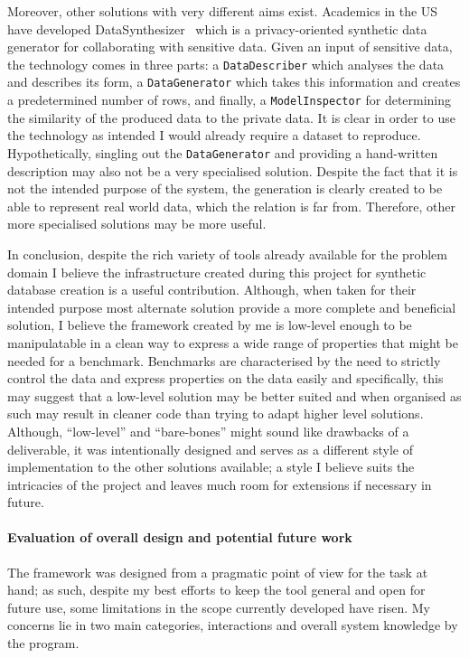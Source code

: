 Moreover, other solutions with very different aims exist. Academics in the US
have developed DataSynthesizer~\cite{DataSynthesizer} which is a privacy-oriented
synthetic data generator for collaborating with sensitive data. Given
an input of sensitive data, the technology comes in three parts: a
\lstinline{DataDescriber} which analyses the data and describes its form, a
\lstinline{DataGenerator} which takes this information and creates a
predetermined number of rows, and finally, a \lstinline{ModelInspector} for
determining the similarity of the produced data to the private data. It is clear
in order to use the technology as intended I would already require a dataset to
reproduce. Hypothetically, singling out the \lstinline{DataGenerator} and
providing a hand-written description may also not be a very specialised
solution. Despite the fact that it is not the intended purpose of the system,
the generation is clearly created to be able to represent real world data, which
the  relation is far from. Therefore, other more specialised
solutions may be more useful.

In conclusion, despite the rich variety of tools already available for the
problem domain I believe the infrastructure created during this project for
synthetic database creation is a useful contribution. Although, when taken for
their intended purpose most alternate solution provide a more complete and
beneficial solution, I believe the framework created by me is low-level enough
to be manipulatable in a clean way to express a wide range of properties that
might be needed for a benchmark. Benchmarks are characterised by the need to
strictly control the data and express properties on the data easily and
specifically, this may suggest that a low-level solution may be better suited
and when organised as such may result in cleaner code than trying to adapt
higher level solutions. Although, ``low-level'' and ``bare-bones''
might sound like drawbacks of a deliverable, it was intentionally designed and serves
as a different style of implementation to the other solutions available; a style
I believe suits the intricacies of the project and leaves much room for
extensions if necessary in future.


\paragraph{Evaluation of overall design and potential future work} The framework
was designed from a pragmatic point of view for the task at hand; as such,
despite my best efforts to keep the tool general and open for future use, some
limitations in the scope currently developed have risen. My concerns lie in two
main categories, interactions and overall system knowledge by the program.

